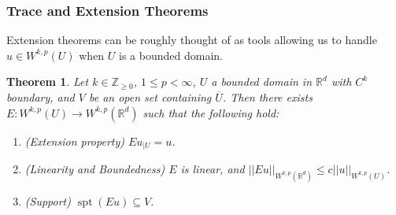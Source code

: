 \documentclass[letterpaper,10pt]{article}
\newcommand{\wkp}{W^{k,p}}
\DeclareMathOperator{\spt}{spt}
\theoremstyle{definition}
\theoremstyle{remark}
\theoremstyle{plain}
\newtheorem{thm}{Theorem}[section]
\begin{document}
\subsubsection{Trace and Extension Theorems}
Extension theorems can be roughly thought of as tools allowing us to handle $u\in\wkp(U)$
when $U$ is a bounded domain.
\begin{thm}\label{thm:extend1}
    Let $k\in\mathbb Z_{\geq 0}$, $1\leq p<\infty$, $U$ a bounded domain in 
    $\mathbb R^d$ with $C^k$ boundary, and $V$ be an open set containing 
    $\overline U$.
    Then there exists $E:\wkp(U)\rightarrow\wkp(\mathbb R^d)$ such that the 
    following hold:
    \begin{enumerate}[label=\roman*.]
        \item (Extension property) $Eu_{|U}=u$.
        \item (Linearity and Boundedness) $E$ is linear, and $||Eu||_{\wkp(\mathbb R^d)}\leq c||u||_{\wkp(U)}$.
        \item (Support) $\spt(Eu)\subseteq V$.
    \end{enumerate}
\end{thm}
\end{document}
